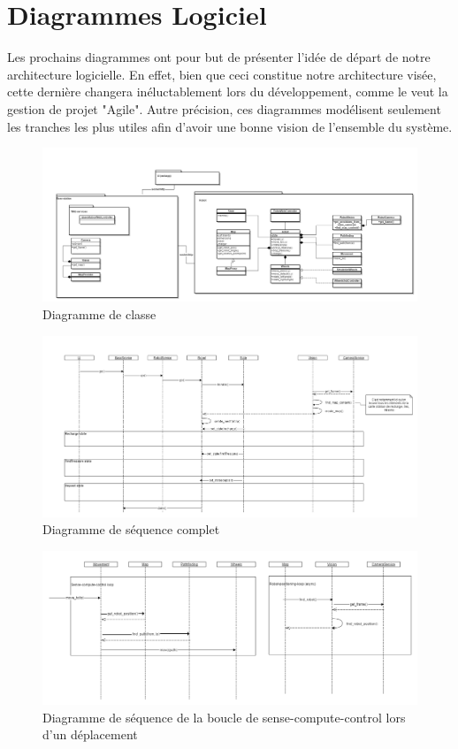 \chapter{Diagrammes Logiciel}
Les prochains diagrammes ont pour but de présenter l'idée de départ de notre architecture logicielle.
En effet, bien que ceci constitue notre architecture visée, cette dernière changera inéluctablement lors du développement, comme le veut la gestion de projet "Agile".
Autre précision, ces diagrammes modélisent seulement les tranches les plus utiles afin d'avoir une bonne vision de l'ensemble du système.

\begin{landscape}
\begin{figure}
  \centering
  \includegraphics[scale=0.4, angle=0]{resources/diagrams/classDiagram.png}
  \caption{Diagramme de classe}
\end{figure}

\begin{figure}
  \centering
  \includegraphics[scale=0.45, angle=0]{resources/diagrams/sequenceDiagram.png}
  \caption{Diagramme de séquence complet}
\end{figure}

\begin{figure}
  \centering
  \includegraphics[scale=0.45, angle=0]{resources/diagrams/robotMovement.png}
  \caption{Diagramme de séquence de la boucle de sense-compute-control lors d'un déplacement}
\end{figure}


\end{landscape}
